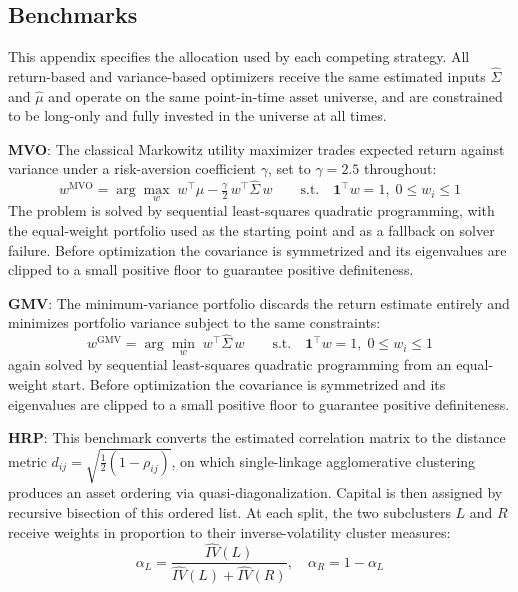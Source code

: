 \documentclass[12pt]{article}
\begin{document}
\subsection{Benchmarks}
\label{app:benchmarks}
This appendix specifies the allocation used by each competing strategy. All return-based and variance-based optimizers receive the same estimated inputs $\hat{\Sigma}$ and $\hat{\mu}$ and operate on the same point-in-time asset universe, and are constrained to be long-only and fully invested in the universe at all times.

\noindent \textbf{MVO}: The classical Markowitz utility maximizer trades expected return against variance under a risk-aversion coefficient $\gamma$, set to $\gamma = 2.5$ throughout:
\begin{equation}
  w^{\text{MVO}} = \arg\max_{w}\;
    w^{\top}\hat{\mu} - \tfrac{\gamma}{2}\, w^{\top}\hat{\Sigma}\, w
  \qquad \text{s.t.}\quad
  \mathbf{1}^{\top} w = 1,\; 0 \le w_i \le 1
  \label{eq:app-mvo}
\end{equation}
The problem is solved by sequential least-squares quadratic programming, with the equal-weight portfolio used as the starting point and as a fallback on solver failure. Before optimization the covariance is symmetrized and its eigenvalues are clipped to a small positive floor to guarantee positive definiteness.

\noindent \textbf{GMV}: The minimum-variance portfolio discards the return estimate entirely and minimizes portfolio variance subject to the same constraints:
\begin{equation}
  w^{\text{GMV}} = \arg\min_{w}\;
    w^{\top}\hat{\Sigma}\, w
  \qquad \text{s.t.}\quad
  \mathbf{1}^{\top} w = 1,\; 0 \le w_i \le 1 
  \label{eq:app-gmv}
\end{equation}
again solved by sequential least-squares quadratic programming from an equal-weight start. Before optimization the covariance is symmetrized and its eigenvalues are clipped to a small positive floor to guarantee positive definiteness.

\noindent \textbf{HRP}: This benchmark converts the estimated correlation matrix to the distance metric $d_{ij} = \sqrt{\tfrac{1}{2}(1 - \rho_{ij})}$, on which single-linkage agglomerative clustering produces an asset ordering via quasi-diagonalization. Capital is then assigned by recursive bisection of this ordered list. At each split, the two subclusters $L$ and $R$ receive weights in proportion to their inverse-volatility cluster measures:
\begin{equation}
\alpha_L = \frac{\widehat{IV}(L)}{\widehat{IV}(L) + \widehat{IV}(R)},
\quad
\alpha_R= 1 - \alpha_L
\end{equation}
\end{document}
